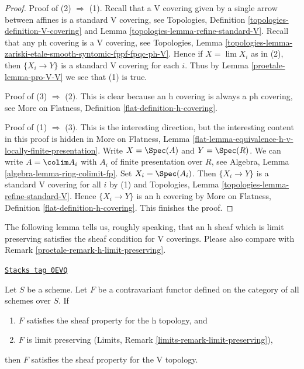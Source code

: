 \begin{proof}

Proof of (2) $\Rightarrow$ (1). Recall that a V covering given by a
single arrow between affines is a standard V covering, see
Topologies, Definition \ref{topologies-definition-V-covering} and
Lemma \ref{topologies-lemma-refine-standard-V}.
Recall that any ph covering is a V covering, see
Topologies, Lemma
\ref{topologies-lemma-zariski-etale-smooth-syntomic-fppf-fpqc-ph-V}.
Hence if $X = \lim X_i$ as in (2), then $\{X_i \to Y\}$
is a standard V covering for each $i$. Thus by
Lemma \ref{proetale-lemma-pro-V-V} we see that (1) is true.

\medskip\noindent
Proof of (3) $\Rightarrow$ (2). This is clear because an h covering
is always a ph covering, see
More on Flatness, Definition \ref{flat-definition-h-covering}.

\medskip\noindent
Proof of (1) $\Rightarrow$ (3). This is the interesting direction, but
the interesting content in this proof is hidden in More on Flatness, Lemma
\ref{flat-lemma-equivalence-h-v-locally-finite-presentation}.
Write $X = \Spec(A)$ and $Y = \Spec(R)$. We can write
$A = \colim A_i$ with $A_i$ of finite presentation over $R$, see
Algebra, Lemma \ref{algebra-lemma-ring-colimit-fp}.
Set $X_i = \Spec(A_i)$. Then $\{X_i \to Y\}$ is a standard V covering
for all $i$ by (1) and
Topologies, Lemma \ref{topologies-lemma-refine-standard-V}.
Hence $\{X_i \to Y\}$ is an h covering by
More on Flatness, Definition \ref{flat-definition-h-covering}.
This finishes the proof.
\end{proof}

The following lemma tells us, roughly speaking, that an h sheaf
which is limit preserving satisfies the sheaf condition for V coverings.
Please also compare with Remark \ref{proetale-remark-h-limit-preserving}.

\begin{lemma}
\label{proetale-lemma-h-limit-preserving}
\href{https://stacks.math.columbia.edu/tag/0EVQ}{\texttt{Stacks tag 0EVQ}}

Let $S$ be a scheme. Let $F$ be a contravariant functor defined
on the category of all schemes over $S$. If
\begin{enumerate}
\item $F$ satisfies the sheaf property for the h topology, and
\item $F$ is limit preserving
(Limits, Remark \ref{limits-remark-limit-preserving}),
\end{enumerate}
then $F$ satisfies the sheaf property for the V topology.
\end{lemma}


